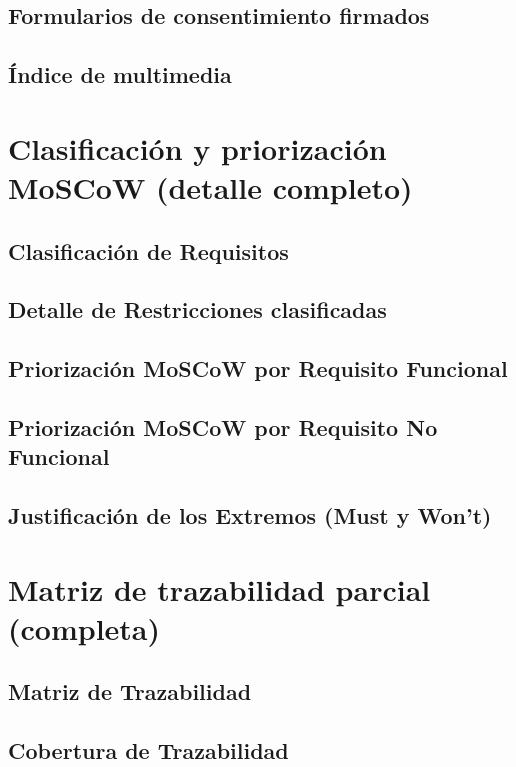 \documentclass[11pt,a4paper]{article}
\begin{document}
\subsection{Formularios de consentimiento firmados}

\subsection{Índice de multimedia}

\section{Clasificación y priorización MoSCoW (detalle completo)}

\subsection{Clasificación de Requisitos}


\subsection{Detalle de Restricciones clasificadas}



\subsection{Priorización MoSCoW por Requisito Funcional}




\subsection{Priorización MoSCoW por Requisito No Funcional}




\subsection{Justificación de los Extremos (Must y Won't)}






\section{Matriz de trazabilidad parcial (completa)}


\subsection{Matriz de Trazabilidad}



\subsection{Cobertura de Trazabilidad}
\end{document}

